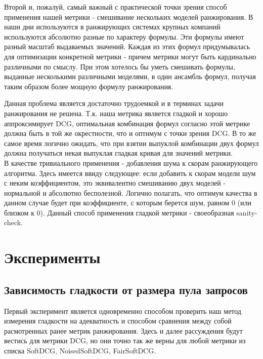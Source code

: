 \documentclass[14pt,a4paper]{amsart}
\theoremstyle{definition}
\theoremstyle{definition}
\begin{document}
Второй и, пожалуй, самый важный с практической точки зрения способ применения нашей метрики - смешивание нескольких моделей ранжирования. В наши дни используются в ранжирующих системах крупных компаний используются абсолютно разные по характеру формулы. Эти формулы имеют разный масштаб выдаваемых значений. Каждая из этих формул придумывалась для оптимизации конкретной метрики - причем метрики могут быть кардинально различными по смыслу. При этом хотелось бы уметь смешивать формулы, выданные несколькими различными моделями, в один ансамбль формул, получая таким образом более мощную формулу ранжирования.

Данная проблема является достаточно трудоемкой и в терминах задачи ранжирования не решена. Т.к. наша метрика является гладкой и хорошо аппроксимирует DCG, оптимальная комбинация формул согласно этой метрике должна быть в той же окрестности, что и оптимум с точки зрения DCG. В то же самое время логично ожидать, что при взятии выпуклой комбинации двух формул должна получаться некая выпуклая гладкая кривая для значений метрики. \\

В качестве тривиального применения - добавления шума к скорам ранжирующего алгоритма. Здесь имеется ввиду следующее: если добавить к скорам модели шум с неким коэффициентом, это эквивалентно смешиванию двух моделей - нормальной и абсолютно бесполезной. Логично полагать, что оптимум качества в данном случае будет при коэффициенте, с которым берется шум, равном 0 (или близком к 0). Данный способ применения гладкой метрики - своеобразная sanity-check.


\newpage
\section{Эксперименты}

\subsection{Зависимость гладкости от размера пула запросов}

Первый эксперимент является одновременно способом проверить наш метод измерения гладкости на адекватность и способом сравнения между собой расмотренных ранее метрик ранжирования. Здесь и далее рассуждения будут вестись для метрики DCG, но они точно так же верны для любой метрики из списка SoftDCG, NoisedSoftDCG, FairSoftDCG.\\
\end{document}
